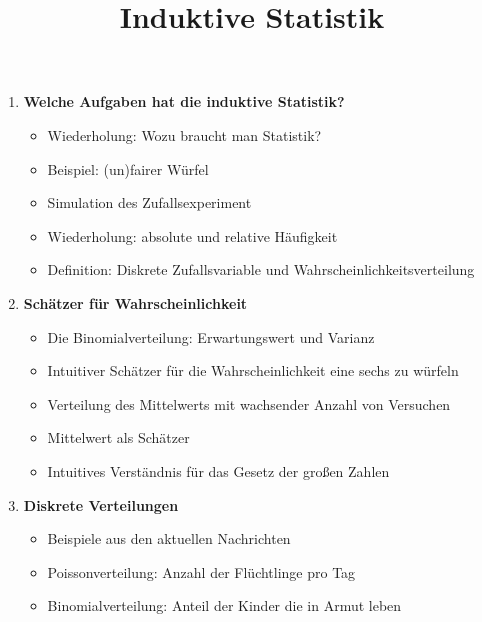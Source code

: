 \documentclass[a4paper,fontsize=13pt]{scrartcl}
\title{Induktive Statistik}
\date{\vspace{-10ex}}
\begin{document}
\maketitle
\begin{enumerate}
   \item{ \textbf{Welche Aufgaben hat die induktive Statistik?}
   \begin{itemize}
      \item{Wiederholung: Wozu braucht man Statistik?}
      \item{Beispiel:  (un)fairer Würfel}
      \item{Simulation des Zufallsexperiment}
      \item{Wiederholung: absolute und relative Häufigkeit}
      \item{Definition: Diskrete Zufallsvariable und Wahrscheinlichkeitsverteilung}
   \end{itemize}
   }
   \item{ \textbf{Schätzer für Wahrscheinlichkeit}
     
       \begin{itemize}
         \item{Die Binomialverteilung: Erwartungswert und Varianz}
         \item{Intuitiver Schätzer für die Wahrscheinlichkeit eine sechs zu würfeln}
         \item{Verteilung des Mittelwerts mit wachsender Anzahl von Versuchen}
         \item{Mittelwert als Schätzer}
         \item{Intuitives Verständnis für das Gesetz der großen Zahlen}
         \end{itemize}
      } 
 
   
    \item{\textbf{Diskrete Verteilungen}
     \begin{itemize}
          \item{Beispiele aus den aktuellen Nachrichten} %
          \item{Poissonverteilung: Anzahl der Flüchtlinge pro Tag}
          \item{Binomialverteilung: Anteil der Kinder die in Armut leben}
     \end{itemize}
   }
   

\end{enumerate}
\end{document}
